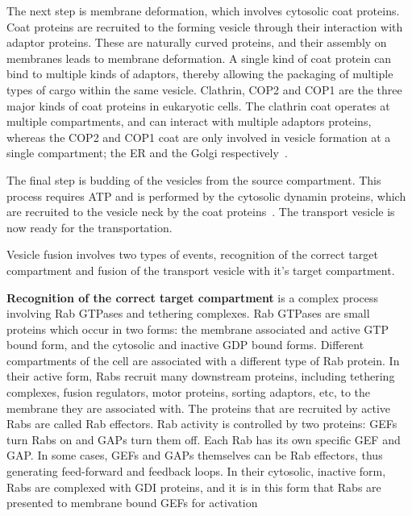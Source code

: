 The next step is membrane deformation, which involves cytosolic coat proteins.
Coat proteins are recruited to the forming vesicle through their interaction with adaptor proteins. 
%
These are naturally curved proteins, and their assembly on membranes leads to membrane deformation.
%
A single kind of coat protein can bind to multiple kinds of adaptors, thereby allowing the packaging of multiple types of cargo within the same vesicle. 
%
Clathrin, COP2 and COP1 are the three major kinds of coat proteins in eukaryotic cells. 
%
The clathrin coat operates at multiple compartments, and can interact with multiple adaptors proteins, whereas the COP2 and COP1 coat are only involved in vesicle formation at a single compartment; the ER and the Golgi respectively~\cite{faini2013vesicle}.
	
The final step is budding of the vesicles from the source compartment.
This process requires ATP and is performed by the cytosolic dynamin proteins, which are recruited to the vesicle neck by the coat proteins~\cite{cocucci2014dynamin}.
%
The transport vesicle is now ready for the transportation.

Vesicle fusion involves two types of events, recognition of the correct target compartment and fusion of the transport vesicle with it's target compartment.

	 \textbf{Recognition of the correct target compartment} is a complex process involving Rab
	GTPases and tethering complexes.
	 Rab GTPases are small proteins which occur in two forms: the membrane associated and active
		GTP bound form, and the cytosolic and inactive GDP bound forms. 
		Different compartments of the
		cell are associated with a different type of Rab protein. In their active form, Rabs recruit many
		downstream proteins, including tethering complexes, fusion regulators, motor proteins, sorting
		adaptors, etc, to the membrane they are associated with. 
		The proteins that are recruited by active
		Rabs are called Rab effectors.
		Rab activity is controlled by two proteins: GEFs turn Rabs on and
		GAPs turn them off. 
		Each Rab has its own specific GEF and GAP. In some cases, GEFs and GAPs
		themselves can be Rab effectors, thus generating feed-forward and feedback loops. 
		In their cytosolic, inactive form, Rabs are complexed with GDI proteins, and it is in this form that Rabs are presented to membrane bound GEFs for activation~\cite{muller2018molecular}
		
